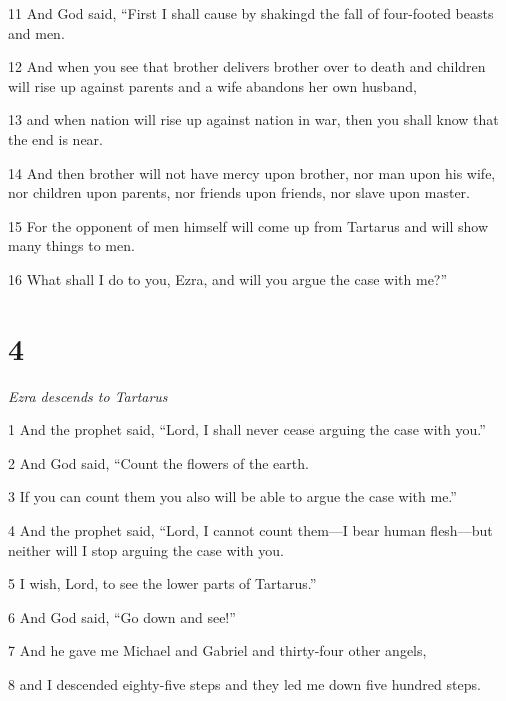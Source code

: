 \par 11 And God said, “First I shall cause by shakingd the fall of four-footed beasts and men.

\par 12 And when you see that brother delivers brother over to death and children will rise up against parents and a wife abandons her own husband,

\par 13 and when nation will rise up against nation in war, then you shall know that the end is near.

\par 14 And then brother will not have mercy upon brother, nor man upon his wife, nor children upon parents, nor friends upon friends, nor slave upon master.

\par 15 For the opponent of men himself will come up from Tartarus and will show many things to men.

\par 16 What shall I do to you, Ezra, and will you argue the case with me?”

\chapter{4}

\par \textit{Ezra descends to Tartarus}

\par 1 And the prophet said, “Lord, I shall never cease arguing the case with you.”

\par 2 And God said, “Count the flowers of the earth. 

\par 3 If you can count them you also will be able to argue the case with me.”

\par 4 And the prophet said, “Lord, I cannot count them—I bear human flesh—but neither will I stop arguing the case with you.

\par 5 I wish, Lord, to see the lower parts of Tartarus.”

\par 6 And God said, “Go down and see!” 

\par 7 And he gave me Michael and Gabriel and thirty-four other angels,

\par 8 and I descended eighty-five steps and they led me down five hundred steps.

